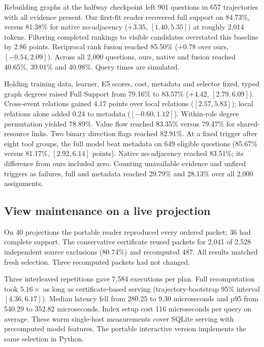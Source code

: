 \documentclass[conference]{IEEEtran}
\begin{document}
Rebuilding graphs at the halfway checkpoint left 901 questions in 657 trajectories with all evidence present. Our first-fit reader recovered full support on 84.73\%, versus 81.38\% for native no-adjacency ($+3.35$, $[1.40,5.35]$) at roughly 2,014 tokens. Filtering completed rankings to visible candidates overstated this baseline by 2.86 points. Reciprocal rank fusion reached 85.50\% ($+0.78$ over ours, $[-0.54,2.09]$). Across all 2,000 questions, ours, native and fusion reached 40.65\%, 39.01\% and 40.98\%. Query times are simulated.

Holding training data, learner, E5 scores, cost, metadata and selector fixed, typed graph degrees raised Full Support from 79.16\% to 83.57\% ($+4.42$, $[2.79,6.09]$). Cross-event relations gained 4.17 points over local relations ($[2.57,5.83]$); local relations alone added 0.24 to metadata ($[-0.60,1.12]$). Within-role degree permutation yielded 78.89\%. Value flow reached 83.35\% versus 79.47\% for shared-resource links. Two binary direction flags reached 82.91\%. At a fixed trigger after eight tool groups, the full model beat metadata on 649 eligible questions (85.67\% versus 81.17\%, $[2.92,6.14]$ points). Native no-adjacency reached 83.51\%; its difference from ours included zero. Counting unavailable evidence and unfired triggers as failures, full and metadata reached 29.79\% and 28.13\% over all 2,000 assignments.


\subsection{View maintenance on a live projection}
On 40 projections the portable reader reproduced every ordered packet; 36 had complete support. The conservative certificate reused packets for 2,041 of 2,528 independent source exclusions (80.74\%) and recomputed 487. All results matched fresh selection. Three recomputed packets had not changed.

Three interleaved repetitions gave 7,584 executions per plan. Full recomputation took $5.16\times$ as long as certificate-based serving (trajectory-bootstrap 95\% interval $[4.36,6.17]$). Median latency fell from 280.25 to 9.30 microseconds and p95 from 540.29 to 352.82 microseconds. Index setup cost 116 microseconds per query on average. These warm single-host measurements cover SQLite serving with precomputed model features. The portable interactive version implements the same selection in Python.
\end{document}
